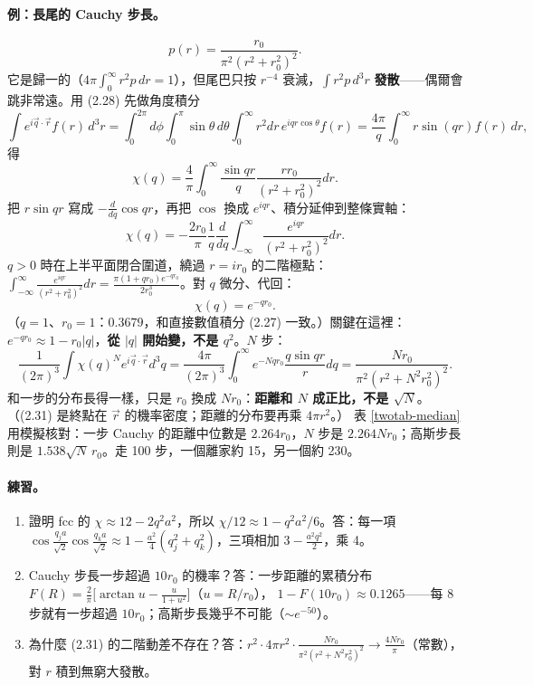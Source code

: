 \paragraph{例：長尾的 Cauchy 步長。}
\[p(r)=\frac{r_0}{\pi^2(r^2+r_0^2)^2}.\tag{2.26}\]
它是歸一的（$4\pi\int_0^\infty r^2p\,dr=1$），但尾巴只按 $r^{-4}$ 衰減，$\int r^2p\,d^3r$ \textbf{發散}——偶爾會跳非常遠。用 (2.28) 先做角度積分
\[\int e^{i\vec q\cdot\vec r}f(r)\,d^3r=\int_0^{2\pi}d\phi\int_0^\pi\sin\theta\,d\theta\int_0^\infty r^2dr\,e^{iqr\cos\theta}f(r)=\frac{4\pi}{q}\int_0^\infty r\sin(qr)f(r)\,dr,\tag{2.28}\]
得
\[\chi(q)=\frac4\pi\int_0^\infty\frac{\sin qr}{q}\frac{rr_0}{(r^2+r_0^2)^2}dr.\tag{2.27}\]
把 $r\sin qr$ 寫成 $-\frac{d}{dq}\cos qr$，再把 $\cos$ 換成 $e^{iqr}$、積分延伸到整條實軸：
\[\chi(q)=-\frac{2r_0}{\pi}\frac1q\frac{d}{dq}\int_{-\infty}^{\infty}\frac{e^{iqr}}{(r^2+r_0^2)^2}dr.\tag{2.29}\]
$q>0$ 時在上半平面閉合圍道，繞過 $r=ir_0$ 的二階極點：$\int_{-\infty}^\infty\frac{e^{iqr}}{(r^2+r_0^2)^2}dr=\frac{\pi(1+qr_0)e^{-qr_0}}{2r_0^3}$。對 $q$ 微分、代回：
\[\chi(q)=e^{-qr_0}.\tag{2.30}\]
（$q=1$、$r_0=1$：$0.3679$，和直接數值積分 (2.27) 一致。）關鍵在這裡：$e^{-qr_0}\approx1-r_0|q|$，\textbf{從 $|q|$ 開始變，不是 $q^2$}。$N$ 步：
\[\frac1{(2\pi)^3}\int\chi(q)^Ne^{i\vec q\cdot\vec r}d^3q=\frac{4\pi}{(2\pi)^3}\int_0^\infty e^{-Nqr_0}\frac{q\sin qr}{r}dq=\frac{Nr_0}{\pi^2(r^2+N^2r_0^2)^2}.\tag{2.31}\]
和一步的分布長得一樣，只是 $r_0$ 換成 $Nr_0$：\textbf{距離和 $N$ 成正比，不是 $\sqrt N$}。（(2.31) 是終點在 $\vec r$ 的機率密度；距離的分布要再乘 $4\pi r^2$。）
表 \ref{twotab-median} 用模擬核對：一步 Cauchy 的距離中位數是 $2.264r_0$，$N$ 步是 $2.264Nr_0$；高斯步長則是 $1.538\sqrt N\,r_0$。走 100 步，一個離家約 15，另一個約 230。
\begin{table}[H]
\centering
\caption{三維漫步走 $N$ 步後離家距離的中位數（各 400 人模擬，$r_0=1$）}\label{twotab-median}
\TwoTabMedian
\end{table}

\paragraph{練習。}
\begin{enumerate}
\item 證明 fcc 的 $\chi\approx12-2q^2a^2$，所以 $\chi/12\approx1-q^2a^2/6$。\quad 答：每一項 $\cos\frac{q_ja}{\sqrt2}\cos\frac{q_ka}{\sqrt2}\approx1-\frac{a^2}4(q_j^2+q_k^2)$，三項相加 $3-\frac{a^2q^2}2$，乘 4。
\item Cauchy 步長一步超過 $10r_0$ 的機率？\quad 答：一步距離的累積分布 $F(R)=\frac2\pi\big[\arctan u-\frac{u}{1+u^2}\big]$（$u=R/r_0$），
$1-F(10r_0)\approx0.1265$——每 8 步就有一步超過 $10r_0$；高斯步長幾乎不可能（$\sim e^{-50}$）。
\item 為什麼 (2.31) 的二階動差不存在？\quad 答：$r^2\cdot4\pi r^2\cdot\frac{Nr_0}{\pi^2(r^2+N^2r_0^2)^2}\to\frac{4Nr_0}{\pi}$（常數），對 $r$ 積到無窮大發散。
\end{enumerate}

